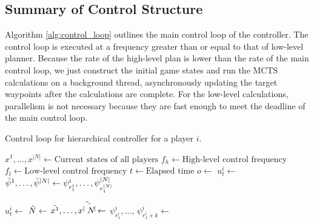 \subsection{Summary of Control Structure}
Algorithm \ref{alg:control_loop} outlines the main control loop of the controller. The control loop is executed at a frequency greater than or equal to that of low-level planner. Because the rate of the high-level plan is lower than the rate of the main control loop, we just construct the initial game states and run the MCTS calculations on a background thread, asynchronously updating the target waypoints after the calculations are complete. For the low-level calculations, parallelism is not necessary because they are fast enough to meet the deadline of the main control loop. 

\begin{algorithm}
\caption{Control loop for hierarchical controller for a player $i$.}\label{alg:control_loop}
\begin{algorithmic}
\State $x^1,\ldots, x^{|N|} \gets \text{Current states of all players}$
\State $f_h \gets \text{High-level control frequency}$
\State $f_l \gets \text{Low-level control frequency}$
\State $t \gets \text{Elapsed time}$
 
 
    \State $o \gets$ 
    \State $u^i_t \gets$ 
    \State $\Bar{\psi}^1,\ldots,\Bar{\psi}^{|N|}  \gets \psi^i_{r^i_{1}},\ldots,\psi^{|N|}_{r^{|N|}_{1}}$ 
    
    
    \State $u^i_t \gets$ 
    \EndIf
\EndIf
{} 
    \State $\Tilde{N} \gets$ 
    \State $\Tilde{x^1},\ldots, \Tilde{x^{|\Tilde{N}|}} \gets$ 
    \State $\psi^i_{r^i_{1}}, ..., \, \psi^i_{r^i_{1} + k} \gets$  
    
\EndIf
\EndIf
\end{algorithmic}
\end{algorithm}

